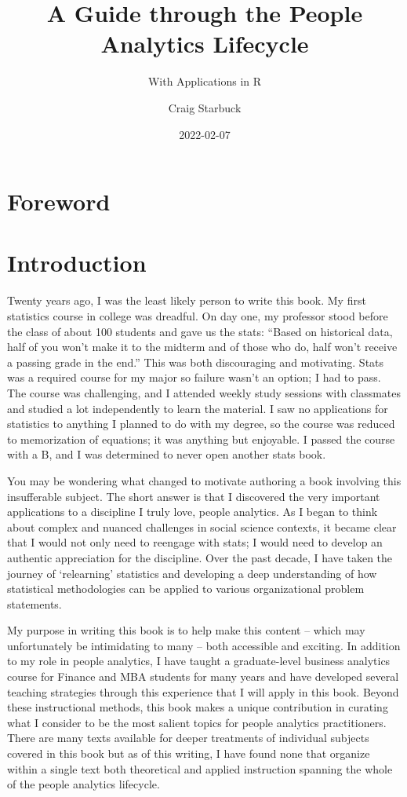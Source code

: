 \documentclass[]{book}
\title{A Guide through the People Analytics Lifecycle}
\subtitle{With Applications in R}
\author{Craig Starbuck}
\date{2022-02-07}
\begin{document}
\maketitle

{
\setcounter{tocdepth}{1}
\tableofcontents
}
\hypertarget{foreword}{%
\chapter{Foreword}\label{foreword}}

\hypertarget{introduction}{%
\chapter{Introduction}\label{introduction}}

Twenty years ago, I was the least likely person to write this book. My first statistics course in college was dreadful. On day one, my professor stood before the class of about 100 students and gave us the stats: ``Based on historical data, half of you won't make it to the midterm and of those who do, half won't receive a passing grade in the end.'' This was both discouraging and motivating. Stats was a required course for my major so failure wasn't an option; I had to pass. The course was challenging, and I attended weekly study sessions with classmates and studied a lot independently to learn the material. I saw no applications for statistics to anything I planned to do with my degree, so the course was reduced to memorization of equations; it was anything but enjoyable. I passed the course with a B, and I was determined to never open another stats book.

You may be wondering what changed to motivate authoring a book involving this insufferable subject. The short answer is that I discovered the very important applications to a discipline I truly love, people analytics. As I began to think about complex and nuanced challenges in social science contexts, it became clear that I would not only need to reengage with stats; I would need to develop an authentic appreciation for the discipline. Over the past decade, I have taken the journey of `relearning' statistics and developing a deep understanding of how statistical methodologies can be applied to various organizational problem statements.

My purpose in writing this book is to help make this content -- which may unfortunately be intimidating to many -- both accessible and exciting. In addition to my role in people analytics, I have taught a graduate-level business analytics course for Finance and MBA students for many years and have developed several teaching strategies through this experience that I will apply in this book. Beyond these instructional methods, this book makes a unique contribution in curating what I consider to be the most salient topics for people analytics practitioners. There are many texts available for deeper treatments of individual subjects covered in this book but as of this writing, I have found none that organize within a single text both theoretical and applied instruction spanning the whole of the people analytics lifecycle.
\end{document}

